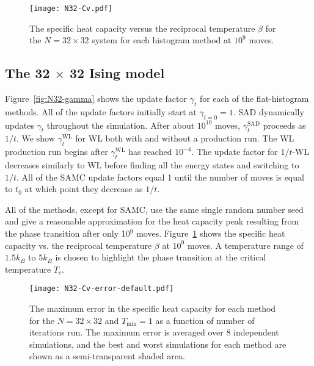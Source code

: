 
\begin{figure}
  \texttt{[image: N32-Cv.pdf]}
  \caption{
    The specific heat capacity versus the reciprocal temperature $\beta$ for the $N=32 \times 32$ system for each histogram method at $10^{9}$ moves.}
  \label{fig:N32-cv}
\end{figure}

\subsection{The 32 $\times$ 32 Ising model}
Figure~\ref{fig:N32-gamma} shows the update factor $\gamma_t$ for each
of the flat-histogram methods. All of the update factors initially
start at $\gamma_{t=0} = 1$. SAD dynamically updates $\gamma_t$
throughout the simulation. After about $10^{10}$ moves,
$\gamma^{\text{SAD}}_t$ proceeds as $1/t$. We show
$\gamma^{\text{WL}}_t$ for WL both with and without a production
run. The WL production run begins after $\gamma^{\text{WL}}_t$ has reached
$10^{-4}$. The update factor for $1/t$-WL decreases similarly to WL
before finding all the energy states and switching to $1/t$. All of
the SAMC update factors equal 1 until the number of moves is equal to
$t_0$ at which point they decrease as $1/t$.

All of the methods, except for SAMC, use the same single random number seed and
give a reasonable approximation for the heat capacity peak resulting from the
phase transition after only 10$^9$ moves. Figure~\ref{fig:N32-cv} shows the
specific heat capacity vs. the reciprocal temperature $\beta$ at $10^{9}$ moves.
A temperature range of $1.5k_B$ to $5k_B$ is chosen to highlight
the phase transition at the critical temperature $T_c$.

\begin{figure}
  \texttt{[image: N32-Cv-error-default.pdf]}
  \caption{The maximum error in the specific heat capacity for each method for the $N=32 \times 32$ and $T_{\min} = 1$ as a function of number of iterations run.  The maximum error is averaged over 8 independent simulations, and the best and worst simulations for each method are shown as a semi-transparent shaded area.}
  \label{fig:N32-cv-error}
\end{figure}

